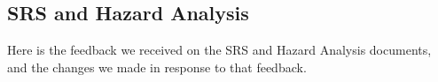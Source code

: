 \documentclass{article}
\begin{document}


\subsection{SRS and Hazard Analysis}
Here is the feedback we received on the SRS and Hazard Analysis documents, and the changes we made in response to that feedback.
\end{document}
